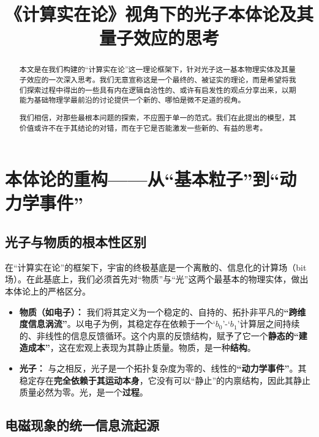 \documentclass[12pt]{article}
\title{《计算实在论》视角下的光子本体论及其量子效应的思考}
\author{} %
\date{}   %
\begin{document}
\maketitle

\begin{abstract}

本文是在我们构建的``计算实在论''这一理论框架下，针对光子这一基本物理实体及其量子效应的一次深入思考。我们无意宣称这是一个最终的、被证实的理论，而是希望将我们探索过程中得出的一些具有内在逻辑自洽性的、或许有启发性的观点分享出来，以期能为基础物理学最前沿的讨论提供一个新的、哪怕是微不足道的视角。

我们相信，对那些最根本问题的探索，不应囿于单一的范式。我们在此提出的模型，其价值或许不在于其结论的对错，而在于它是否能激发一些新的、有益的思考。
\end{abstract}

\section{本体论的重构——从``基本粒子''到``动力学事件''}

\subsection{光子与物质的根本性区别}

在``计算实在论''的框架下，宇宙的终极基底是一个离散的、信息化的计算场（bit场）。在此基底上，我们必须首先对``物质''与``光''这两个最基本的物理实体，做出本体论上的严格区分。

\begin{itemize}
    \item \textbf{物质（如电子）：} 我们将其定义为一个稳定的、自持的、拓扑非平凡的\textbf{``跨维度信息涡流''}。以电子为例，其稳定存在依赖于一个`$b_0$'-`$b_1$'计算层之间持续的、非线性的信息反馈循环。这个内禀的反馈结构，赋予了它一个\textbf{静态的``建造成本''}，这在宏观上表现为其静止质量。物质，是一种\textbf{结构}。

    \item \textbf{光子：} 与之相反，光子是一个拓扑复杂度为零的、线性的\textbf{``动力学事件''}。其稳定存在\textbf{完全依赖于其运动本身}，它没有可以``静止''的内禀结构，因此其静止质量必然为零。光，是一个\textbf{过程}。
\end{itemize}

\subsection{电磁现象的统一信息流起源}
\end{document}
